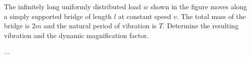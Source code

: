 
\begin{Exercise}[label=infinitely_long_udl]
The infinitely long uniformly distributed load $w$ shown in the figure moves along a simply supported bridge of length $l$ at constant speed $v$. The total mass of the bridge is $2m$ and the natural period of vibration is $T$. Determine the resulting vibration and the dynamic magnification factor.

\begin{center}
\end{center}

\shortAnswer ...
\end{Exercise}


\begin{Answer}[ref=infinitely_long_udl]

\end{Answer}